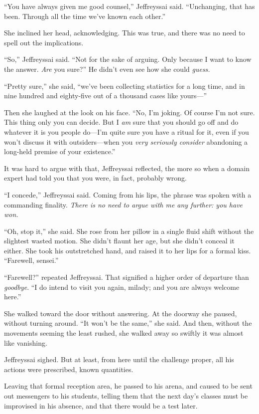 {
 ``You have always given me good
counsel,'' Jeffreyssai said.
``Unchanging, that has been. Through all the time
we've known each other.''}

{
 She inclined her head, acknowledging. This was true, and there was
no need to spell out the implications.}

{
 ``So,'' Jeffreyssai said.
``Not for the sake of arguing. Only because I want to
know the answer. \textit{Are} you sure?'' He
didn't even see how she could \textit{guess.}}

{
 ``Pretty sure,'' she said,
``we've been collecting statistics for
a long time, and in nine hundred and eighty-five out of a thousand
cases like yours---''}

{
 Then she laughed at the look on his face. ``No,
I'm joking. Of course I'm not sure.
This thing only you can decide. But I \textit{am} sure that you should
go off and do whatever it is you people do---I'm quite
sure you have a ritual for it, even if you won't
discuss it with outsiders---when you \textit{very seriously consider}
abandoning a long-held premise of your existence.''}

{
 It was hard to argue with that, Jeffreyssai reflected, the more so
when a domain expert had told you that you were, in fact, probably
wrong.}

{
 ``I concede,'' Jeffreyssai
said. Coming from his lips, the phrase was spoken with a commanding
finality. \textit{There is no need to argue with me any further: you
have won.}}

{
 ``Oh, stop it,'' she said. She
rose from her pillow in a single fluid shift without the slightest
wasted motion. She didn't flaunt her age, but she
didn't conceal it either. She took his outstretched
hand, and raised it to her lips for a formal kiss.
``Farewell, sensei.''}

{
 ``Farewell?'' repeated
Jeffreyssai. That signified a higher order of departure than
\textit{goodbye}. ``I do intend to visit you again,
milady; and you are always welcome here.''}

{
 She walked toward the door without answering. At the doorway she
paused, without turning around. ``It
won't be the same,'' she said. And
then, without the movements seeming the least rushed, she walked away
so swiftly it was almost like vanishing.}

{
 Jeffreyssai sighed. But at least, from here until the challenge
proper, all his actions were prescribed, known quantities.}

{
 Leaving that formal reception area, he passed to his arena, and
caused to be sent out messengers to his students, telling them that the
next day's classes must be improvised in his absence,
and that there would be a test later.}

